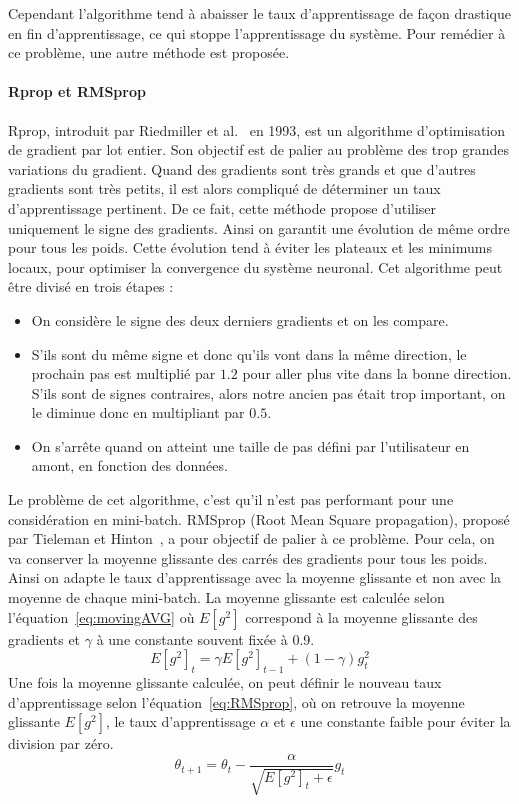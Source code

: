 Cependant l'algorithme tend à abaisser le taux d'apprentissage de façon drastique en fin d'apprentissage, ce qui stoppe l'apprentissage du système. Pour remédier à ce problème, une autre méthode est proposée.

\paragraph{Rprop et RMSprop}
Rprop, introduit par Riedmiller et al.~\cite{Riedmiller1993} en 1993, est un algorithme d'optimisation de gradient par lot entier. Son objectif est de palier au problème des trop grandes variations du gradient. Quand des gradients sont très grands et que d'autres gradients sont très petits, il est alors compliqué de déterminer un taux d'apprentissage pertinent. De ce fait, cette méthode propose d'utiliser uniquement le signe des gradients. Ainsi on garantit une évolution de même ordre pour tous les poids. Cette évolution tend à éviter les plateaux et les minimums locaux, pour optimiser la convergence du système neuronal. Cet algorithme peut être divisé en trois étapes :
\begin{itemize}
  \item On considère le signe des deux derniers gradients et on les compare.
  \item S'ils sont du même signe et donc qu'ils vont dans la même direction, le prochain pas est multiplié par $1.2$ pour aller plus vite dans la bonne direction. S'ils sont de signes contraires, alors notre ancien pas était trop important, on le diminue donc en multipliant par $0.5$.
  \item On s'arrête quand on atteint une taille de pas défini par l'utilisateur en amont, en fonction des données.
\end{itemize}

Le problème de cet algorithme, c'est qu'il n'est pas performant pour une considération en mini-batch. RMSprop (Root Mean Square propagation), proposé par Tieleman et Hinton~\cite{Tieleman2012}, a pour objectif de palier à ce problème. Pour cela, on va conserver la moyenne glissante des carrés des gradients pour tous les poids. Ainsi on adapte le taux d'apprentissage avec la moyenne glissante et non avec la moyenne de chaque mini-batch. La moyenne glissante est calculée selon l'équation~\ref{eq:movingAVG} où $E[g^{2}]$ correspond à la moyenne glissante des gradients et $\gamma$ à une constante souvent fixée à 0.9.
\begin{equation}
  E\left[g^{2}\right]_{t} = \gamma E\left[g^{2}\right]_{t-1} + \left(1 - \gamma\right) g^{2}_{t}
  \label{eq:movingAVG}
\end{equation}
Une fois la moyenne glissante calculée, on peut définir le nouveau taux d'apprentissage selon l'équation~\ref{eq:RMSprop}, où on retrouve la moyenne glissante $E[g^{2}]$, le taux d'apprentissage $\alpha$ et $\epsilon$ une constante faible pour éviter la division par zéro.
\begin{equation}
  \theta_{t+1} = \theta_{t} - \frac{\alpha}{\sqrt{E\left[g^{2}\right]_{t} + \epsilon}}g_{t}
  \label{eq:RMSprop}
\end{equation}

